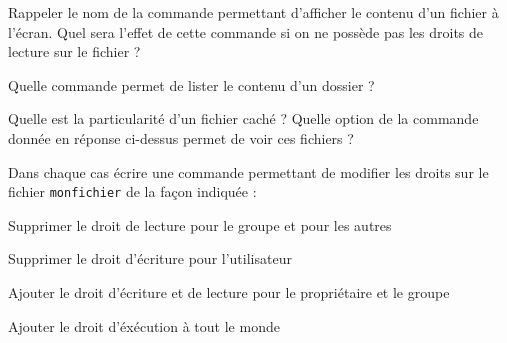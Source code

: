 \documentclass[11pt,a4paper]{article}
\begin{document}
\QListe
\item Rappeler le nom de la commande permettant d'afficher le contenu d'un fichier à l'écran. Quel sera l'effet de cette commande si on ne possède pas les droits de lecture sur le fichier ?\\
\lpo[2]
\item Quelle commande permet de lister le contenu d'un dossier ? \\
\lpo[1]
\item Quelle est la particularité d'un fichier caché ? Quelle option de la commande donnée en réponse ci-dessus permet de voir ces fichiers ? \\
\lpo[2]
\item Dans chaque cas écrire une commande permettant de modifier les droits sur le fichier \texttt{monfichier} de la façon indiquée :
\SQListe
\item Supprimer le droit de lecture pour le groupe et pour les autres\\
\lpo[1]
\item Supprimer le droit d'écriture pour l'utilisateur \\
\lpo[1]
\item Ajouter le droit d'écriture et de lecture pour le propriétaire et le groupe\\
\lpo[1]
\item Ajouter le droit d'éxécution à tout le monde \\
\lpo[1]
\FinListe
\FinListe
\vspace{0.3cm}

\pagebreak
\end{document}
